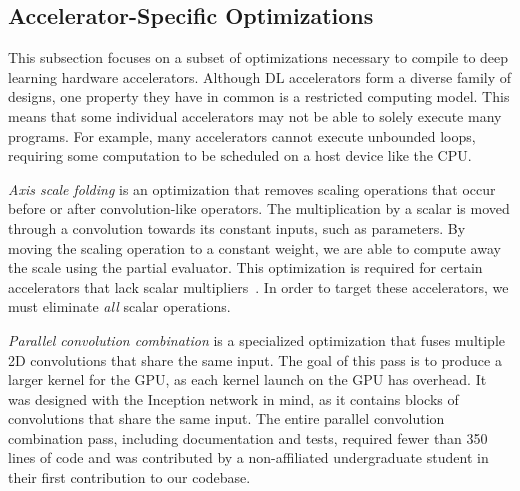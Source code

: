 \subsection{Accelerator-Specific Optimizations}
\label{sec:accel-opts}


This subsection focuses on a subset of optimizations necessary to
  compile \relay to deep learning hardware accelerators.
Although DL accelerators form a diverse family of designs,
  one property they have in common is a restricted computing model.
This means that some individual accelerators
  may not be able to solely execute many \relay programs.
For example, many accelerators cannot execute unbounded loops,
  requiring some computation to be scheduled on a host device
  like the CPU.

\textit{Axis scale folding} is an optimization that removes scaling
  operations that occur before or after convolution-like operators.
The multiplication by a scalar is moved through a convolution towards
  its constant inputs, such as parameters.
By moving the scaling operation to a constant weight, we are able
  to compute away the scale using the partial evaluator.
This optimization is required for certain accelerators that lack scalar multipliers~\cite{moreau2018vta}.
In order to target these accelerators,
  we must eliminate \textit{all} scalar operations.

\textit{Parallel convolution combination} is a specialized
  optimization that fuses multiple 2D convolutions that share the same input.
The goal of this pass is to produce a larger kernel for the GPU,
  as each kernel launch on the GPU has overhead.
It was designed with the Inception network \cite{inception} in mind, as it
  contains blocks of convolutions that share the same input.
The entire parallel convolution combination pass,
  including documentation and tests,
  required fewer than 350 lines of code and was contributed
  by a non-\relay affiliated undergraduate student
  in their first contribution to our codebase.
